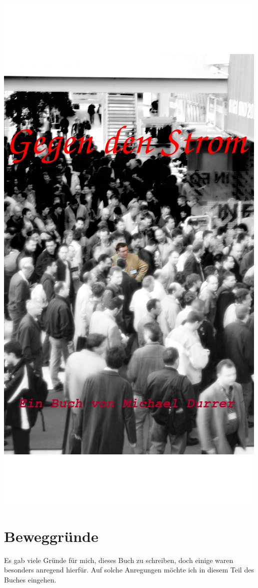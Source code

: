 \documentclass[a5paper,12pt,fleqn,titlepage,twoside]{book}
\begin{document}
 \includegraphics{cover.png}\hfill\vfill
\newpage
\tableofcontents
\part{Beweggründe}
\label{part:Beweggründe}
Es gab viele Gründe für mich, dieses Buch zu schreiben, doch einige waren besonders anregend hierfür. Auf solche Anregungen möchte ich in diesem Teil des Buches eingehen.
\end{document}
